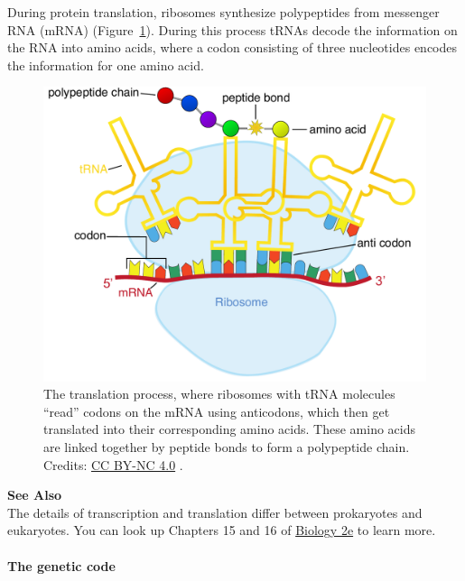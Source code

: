 During protein translation, ribosomes synthesize polypeptides from messenger RNA (mRNA) (Figure~\ref{translation_alt}).
During this process tRNAs decode the information on the RNA into amino acids, where a codon consisting of three nucleotides encodes the information for one amino acid.

% 

\begin{figure}[!htbp]
\centering
\includegraphics[width=0.7\linewidth]{files/translation_alt-47ee1f3f0d058509ab6b6043187d4a5e.pdf}
\caption[]{The translation process, where ribosomes with tRNA molecules ``read'' codons on the mRNA using anticodons, which then get translated into their corresponding amino acids.
These amino acids are linked together by peptide bonds to form a polypeptide chain.
Credits: \href{https://creativecommons.org/licenses/by-nc/4.0/}{CC BY-NC 4.0} \cite{own_1_2024}.}
\label{translation_alt}
\end{figure}

\begin{framed}
\textbf{See Also}\\
The details of transcription and translation differ between prokaryotes and eukaryotes. You can look up Chapters 15 and 16 of \href{https://openstax.org/details/books/biology-2e}{Biology 2e} to learn more.
\end{framed}

\paragraph{The genetic code}\label{chapter1_genetic_code}

